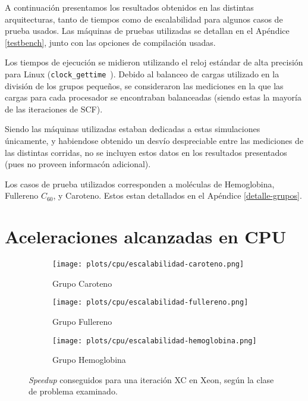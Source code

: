 A continuaci\'on presentamos los resultados obtenidos en las distintas arquitecturas, tanto
de tiempos como de escalabilidad para algunos casos de prueba usados. Las m\'aquinas de pruebas
utilizadas se detallan en el Ap\'endice \ref{testbench}, junto con las opciones de compilaci\'on usadas.

Los tiempos de ejecuci\'on se midieron utilizando el reloj est\'andar de alta
precisi\'on para Linux (\texttt{clock\_gettime}~\cite{LinuxDocumentation}). Debido al
balanceo de cargas utilizado en la divisi\'on de los grupos peque\~nos, se consideraron
las mediciones en la que las cargas para cada procesador se encontraban balanceadas
(siendo estas la mayor\'ia de las iteraciones de SCF).

Siendo las m\'aquinas utilizadas estaban dedicadas a estas simulaciones \'unicamente,
y habiendose obtenido un desv\'io despreciable entre las mediciones de las distintas
corridas, no se incluyen estos datos en los resultados presentados (pues no proveen
informac\'on adicional).

Los casos de prueba utilizados corresponden a mol\'eculas de Hemoglobina, Fullereno $C_{60}$,
y Caroteno. Estos estan detallados en el Ap\'endice \ref{detalle-grupos}.

\section{Aceleraciones alcanzadas en CPU}

\begin{figure}[htbp]
\centering
\begin{subfigure}[b]{\plotwidthtres}
   \texttt{[image: plots/cpu/escalabilidad-caroteno.png]}
   \caption{Grupo Caroteno}
   \label{fig:cpu-scalability-caroteno}
 \end{subfigure}
\begin{subfigure}[b]{\plotwidthtres}
   \texttt{[image: plots/cpu/escalabilidad-fullereno.png]}
   \caption{Grupo Fullereno}
   \label{fig:cpu-scalability-fullereno}
 \end{subfigure}
\begin{subfigure}[b]{\plotwidthtres}
   \texttt{[image: plots/cpu/escalabilidad-hemoglobina.png]}
   \caption{Grupo Hemoglobina}
   \label{fig:cpu-scalability-hemo}
 \end{subfigure}
 \caption{\textit{Speedup} conseguidos para una iteraci\'on XC en Xeon, seg\'un
 la clase de problema examinado.}
 \label{fig:cpu-scalability}
\end{figure}

